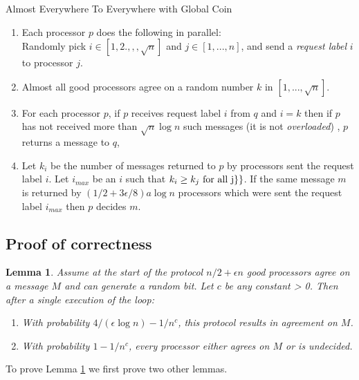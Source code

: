 \documentclass[letterpaper,11pt]{article}
\newtheorem{lemma}{Lemma}
\begin{document}
\begin{algorithm}

\caption{Almost Everywhere To Everywhere with Global Coin}

\begin{enumerate}

\item
Each processor $p$ does the following in parallel:  \\
Randomly pick  $i\in [1,2.,, ,\sqrt{n} ]$ and $j \in [1,...,n]$,  and send  a {\it request label} $i$ to processor $j$.
\item \label{random}
Almost all good processors agree on a random number  $k$ in $[1,...,\sqrt{n}]$.

\item \label{received}
For each processor $p$, if $p$ receives request label $i$ from $q$  and $i=k$ then  
if $p$ has not received more than $ \sqrt{n}\log n$ such messages (it is not {\it overloaded}) ,  
$p$ returns  a message to $q$, 
\item \label{majority}
Let  $k_i$ be the number of messages returned to $p$ by processors sent the request label $i$. Let $i_{max}$ be an $i$ such that  $k_i \geq k_j  \hbox{ for all j}\} \}$. If  the same message $m$  is  returned by $ (1/2 + 3\epsilon/8) a \log n  $  processors which  were sent the request label $i_{max}$ then $p$ decides  $m$.


\end{enumerate}
\end{algorithm}

\subsection{Proof of correctness}

\begin{lemma}\label{singleLoop}
Assume at the start of the protocol $n/2 + \epsilon n$ good processors agree on a message $M$ and can generate a  random bit.  Let $c$ be any constant > 0. Then after a single execution of the loop:
\begin{enumerate}
\item
With probability $4/(\epsilon \log n)-1/n^c$, this protocol results in agreement on $M$. 
\item
With probability $1-1/n^c$, every processor either agrees on $M$ or is undecided.
\end{enumerate}
\end{lemma} 


To prove Lemma \ref{singleLoop} we first prove two other lemmas.
 
\end{document}
